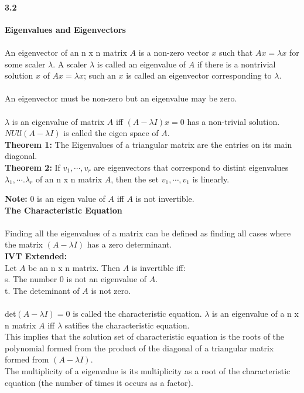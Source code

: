 \documentclass[14pt]{extreport}
\begin{document}
\paragraph{3.2} \textbf{Eigenvalues and Eigenvectors}\\\\

An eigenvector of an n x n matrix $A$ is a non-zero vector $x$ such that $Ax = \lambda x$ for some scaler $\lambda$. A scaler $\lambda$ is called an eigenvalue of $A$ if there is a nontrivial
solution $x$ of $Ax = \lambda x$; such an $x$ is called an eigenvector corresponding to $\lambda$.\\\\

An eigenvector must be non-zero but an eigenvalue may be zero.\\\\

$\lambda$ is an eigenvalue of matrix $A$ iff $(A -\lambda I)x = 0$ has a non-trivial solution.\\
$NUll(A -\lambda I)$ is called the eigen space of $A$.\\


\textbf{Theorem 1: } The Eigenvalues of a triangular matrix are the entries on its main diagonal.\\

\textbf{Theorem 2: } If $v_1, \cdots ,v_r$ are eigenvectors that correspond to distint eigenvalues $\lambda_1, \cdots. \lambda_r$ of an n x n matrix $A$, then the set {$v_1, \cdots, v_1$} is linearly.

\textbf{Note: } 0 is an eigen value of $A$ iff $A$ is not invertible.\\

\textbf{The Characteristic Equation}\\\\
Finding all the eigenvalues of a matrix can be defined as finding all cases where the matrix $(A-\lambda I)$ has a zero determinant.\\

\textbf{IVT Extended:}\\
Let $A$ be an n x n matrix. Then $A$ is invertible iff:\\
s. The number 0 is not an eigenvalue of $A$.\\
t. The deteminant of $A$ is not zero.\\\\

det$(A - \lambda I) =0$ is called the characteristic equation. $\lambda$ is an eigenvalue of a n x n matrix $A$ iff $\lambda$ satifies the characteristic equation.\\
This implies that the solution set of characteristic equation is the roots of the polynomial formed from the product of the diagonal of a triangular matrix formed from $(A - \lambda I)$.\\
The multiplicity of a eigenvalue is its multiplicity as a root of the characteristic equation (the number of times it occurs as a factor).\\\\
\end{document}
